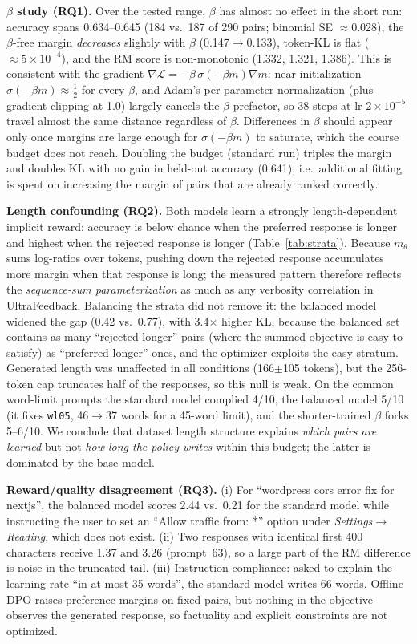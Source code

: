 \documentclass{article}
\begin{document}
\textbf{$\beta$ study (RQ1).} Over the tested range, $\beta$ has almost no effect in the short run: accuracy spans 0.634--0.645 (184 vs.\ 187 of 290 pairs; binomial SE $\approx$0.028), the $\beta$-free margin \emph{decreases} slightly with $\beta$ (0.147$\to$0.133), token-KL is flat ($\approx5{\times}10^{-4}$), and the RM score is non-monotonic (1.332, 1.321, 1.386). This is consistent with the gradient $\nabla\mathcal{L}=-\beta\,\sigma(-\beta m)\nabla m$: near initialization $\sigma(-\beta m)\approx\tfrac12$ for every $\beta$, and Adam's per-parameter normalization (plus gradient clipping at 1.0) largely cancels the $\beta$ prefactor, so 38 steps at lr $2{\times}10^{-5}$ travel almost the same distance regardless of $\beta$. Differences in $\beta$ should appear only once margins are large enough for $\sigma(-\beta m)$ to saturate, which the course budget does not reach. Doubling the budget (standard run) triples the margin and doubles KL with no gain in held-out accuracy (0.641), i.e.\ additional fitting is spent on increasing the margin of pairs that are already ranked correctly.

\textbf{Length confounding (RQ2).} Both models learn a strongly length-dependent implicit reward: accuracy is below chance when the preferred response is longer and highest when the rejected response is longer (Table~\ref{tab:strata}). Because $m_\theta$ sums log-ratios over tokens, pushing down the rejected response accumulates more margin when that response is long; the measured pattern therefore reflects the \emph{sequence-sum parameterization} as much as any verbosity correlation in UltraFeedback. Balancing the strata did not remove it: the balanced model widened the gap (0.42 vs.\ 0.77), with 3.4$\times$ higher KL, because the balanced set contains as many ``rejected-longer'' pairs (where the summed objective is easy to satisfy) as ``preferred-longer'' ones, and the optimizer exploits the easy stratum. Generated length was unaffected in all conditions (166$\pm$105 tokens), but the 256-token cap truncates half of the responses, so this null is weak. On the common word-limit prompts the standard model complied 4/10, the balanced model 5/10 (it fixes \texttt{wl05}, 46$\to$37 words for a 45-word limit), and the shorter-trained $\beta$ forks 5--6/10. We conclude that dataset length structure explains \emph{which pairs are learned} but not \emph{how long the policy writes} within this budget; the latter is dominated by the base model.

\textbf{Reward/quality disagreement (RQ3).} (i) For ``wordpress cors error fix for nextjs'', the balanced model scores 2.44 vs.\ 0.21 for the standard model while instructing the user to set an ``Allow traffic from: *'' option under \emph{Settings$\to$Reading}, which does not exist. (ii) Two responses with identical first 400 characters receive 1.37 and 3.26 (prompt~63), so a large part of the RM difference is noise in the truncated tail. (iii) Instruction compliance: asked to explain the learning rate ``in at most 35 words'', the standard model writes 66 words. Offline DPO raises preference margins on fixed pairs, but nothing in the objective observes the generated response, so factuality and explicit constraints are not optimized.
\end{document}
